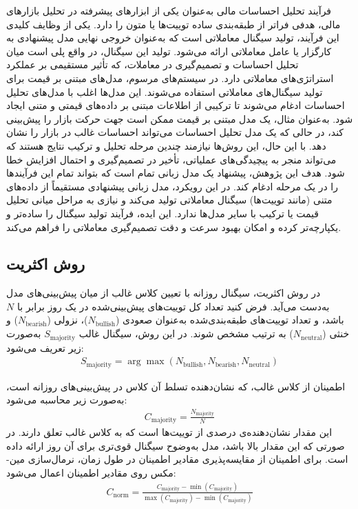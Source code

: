 فرآیند تحلیل احساسات مالی به‌عنوان یکی از ابزارهای پیشرفته در تحلیل بازارهای مالی، هدفی فراتر از طبقه‌بندی ساده توییت‌ها یا متون را دارد. یکی از وظایف کلیدی این فرآیند، تولید سیگنال معاملاتی است که به‌عنوان خروجی نهایی مدل پیشنهادی به کارگزار یا عامل معاملاتی ارائه می‌شود. تولید این سیگنال، در واقع پلی است میان تحلیل احساسات و تصمیم‌گیری در معاملات، که تأثیر مستقیمی بر عملکرد استراتژی‌های معاملاتی دارد. در سیستم‌های مرسوم، مدل‌های مبتنی بر قیمت برای تولید سیگنال‌های معاملاتی استفاده می‌شوند. این مدل‌ها اغلب با مدل‌های تحلیل احساسات ادغام می‌شوند تا ترکیبی از اطلاعات مبتنی بر داده‌های قیمتی و متنی ایجاد شود. به‌عنوان مثال، یک مدل مبتنی بر قیمت ممکن است جهت حرکت بازار را پیش‌بینی کند، در حالی که یک مدل تحلیل احساسات می‌تواند احساسات غالب در بازار را نشان دهد. با این حال، این روش‌ها نیازمند چندین مرحله تحلیل و ترکیب نتایج هستند که می‌تواند منجر به پیچیدگی‌های عملیاتی، تأخیر در تصمیم‌گیری و احتمال افزایش خطا شود. هدف این پژوهش، پیشنهاد یک مدل زبانی تمام است که بتواند تمام این فرآیندها را در یک مرحله ادغام کند. در این رویکرد، مدل زبانی پیشنهادی مستقیماً از داده‌های متنی (مانند توییت‌ها) سیگنال معاملاتی تولید می‌کند و نیازی به مراحل میانی تحلیل قیمت یا ترکیب با سایر مدل‌ها ندارد. این ایده، فرآیند تولید سیگنال را ساده‌تر و یکپارچه‌تر کرده و امکان بهبود سرعت و دقت تصمیم‌گیری معاملاتی را فراهم می‌کند.


\subsection{روش اکثریت}
در روش اکثریت، سیگنال روزانه با تعیین کلاس غالب از میان پیش‌بینی‌های مدل به‌دست می‌آید. فرض کنید تعداد کل توییت‌های پیش‌بینی‌شده در یک روز برابر با \( N \) باشد، و تعداد توییت‌های طبقه‌بندی‌شده به‌عنوان صعودی (\( N_{\text{bullish}} \))، نزولی (\( N_{\text{bearish}} \)) و خنثی (\( N_{\text{neutral}} \)) به ترتیب مشخص شوند. در این روش، سیگنال غالب \( S_{\text{majority}} \) به‌صورت زیر تعریف می‌شود:
\begin{align}
S_{\text{majority}} = \arg\max \left( N_{\text{bullish}}, N_{\text{bearish}}, N_{\text{neutral}} \right)
\end{align}

اطمینان از کلاس غالب، که نشان‌دهنده تسلط آن کلاس در پیش‌بینی‌های روزانه است، به‌صورت زیر محاسبه می‌شود:
\begin{align}
C_{\text{majority}} = \frac{N_{\text{majority}}}{N}
\end{align}
این مقدار نشان‌دهنده‌ی درصدی از توییت‌ها است که به کلاس غالب تعلق دارند. در صورتی که این مقدار بالا باشد، مدل به‌وضوح سیگنال قوی‌تری برای آن روز ارائه داده است. برای اطمینان از مقایسه‌پذیری مقادیر اطمینان در طول زمان، نرمال‌سازی مین-مکس روی مقادیر اطمینان اعمال می‌شود:
\begin{align}
C_{\text{norm}} = \frac{C_{\text{majority}} - \min(C_{\text{majority}})}{\max(C_{\text{majority}}) - \min(C_{\text{majority}})}
\end{align}


